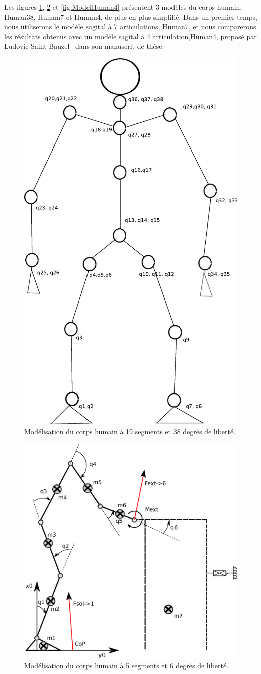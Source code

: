 \documentclass[a4paper, 10pt ]{article}
\begin{document}
Les figures \ref{fig:ModelHuman38}, \ref{fig:ModelHuman7} et  \ref{fig:ModelHuman4} présentent 3 modèles du corps humain, Human38, Human7 et Human4, de plus en plus simplifié. Dans un premier temps, nous utiliserons le modèle sagital à 7 articulations, Human7, et nous comparerons les résultats obtenus avec un modèle sagital à 4 articulation,Human4, proposé par Ludovic Saint-Bauzel~\cite{Saint-Bauzel2009} dans son manuscrit de thèse.


\begin{figure}[h]
\centering
\includegraphics[width=0.6\columnwidth]{images/model/modeleHommeQ.eps}
\caption{Modélisation du corps humain à 19 segments et 38 degrès de liberté. }
\label{fig:ModelHuman38}
\end{figure}

\begin{figure}[h]
\centering
\includegraphics[width=0.6\columnwidth]{images/model/modeleHommeQ7.eps}
\caption{Modélisation du corps humain à 5 segments et 6 degrès de liberté. }
\label{fig:ModelHuman7}
\end{figure}
\end{document}
